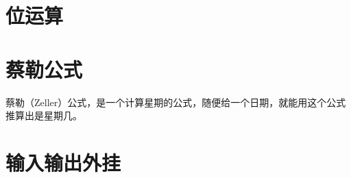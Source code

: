 \section{位运算}


\section{蔡勒公式}

蔡勒（Zeller）公式，是一个计算星期的公式，随便给一个日期，就能用这个公式推算出是星期几。



\section{输入输出外挂}

